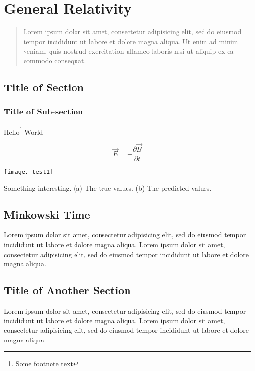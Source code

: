\chapter{General Relativity}\margintoc
\begin{quote}
  Lorem ipsum dolor sit amet, consectetur adipisicing elit, sed do eiusmod tempor incididunt ut labore et dolore magna aliqua. Ut enim ad minim veniam, quis nostrud exercitation ullamco laboris nisi ut aliquip ex ea commodo consequat.
\end{quote}

\section{Title of Section}
\subsection{Title of Sub-section}

\lipsum[1]
Hello\footnote{Some footnote text} World
\lipsum[3-6]

\begin{equation}
\vec{E}=-\frac{\partial \vec{B}}{\partial t}
\end{equation}

\begin{marginfigure}
  \centering
  \texttt{[image: test1]}
  \caption{Something interesting. (a) The true values. (b) The predicted values.}
\end{marginfigure}
\section{Minkowski Time}
\lipsum[22-23]


\lipsum[11-13]
\begin{aside}
  Lorem ipsum dolor sit amet, consectetur adipisicing elit, sed do eiusmod tempor incididunt ut labore et dolore magna aliqua. Lorem ipsum dolor sit amet, consectetur adipisicing elit, sed do eiusmod tempor incididunt ut labore et dolore magna aliqua.
\end{aside}

\section{Title of Another Section}
\lipsum[1]
\begin{aside}[Remark:]
  Lorem ipsum dolor sit amet, consectetur adipisicing elit, sed do eiusmod tempor incididunt ut labore et dolore magna aliqua. Lorem ipsum dolor sit amet, consectetur adipisicing elit, sed do eiusmod tempor incididunt ut labore et dolore magna aliqua.
\end{aside}

